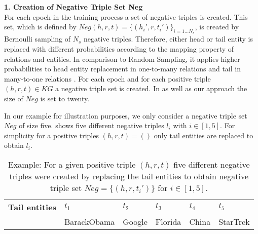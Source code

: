 \textbf{1. Creation of Negative Triple Set Neg}\\
For each epoch in the training process a set of negative triples is created.
This set, which is defined by $Neg(h,r,t)=\{(h_i',r,t_i')\}_{i=1\dots N_s}$, is created by Bernoulli sampling of $N_s$ negative triples.
Therefore, either head or tail entity is replaced with different probabilities according to the mapping property of relations and entities.
In comparison to Random Sampling, it applies higher probabilities to head entity replacement in one-to-many relations and tail in many-to-one relations \cite{qiannegative}.
For each epoch and for each positive triple $(h,r,t) \in KG$ a negative triple set is created.
In \kbgan as well as our approach the size of $Neg$ is set to twenty.

In our example for illustration purposes, we only consider a negative triple set $Neg$ of size five.
 shows five different negative triples $l_i$ with $i \in [1,5]$.
For simplicity for a positive triples $(h,r,t) = (\text{})$
only tail entities are replaced to obtain $l_i$. 
\begin{table}[h]
    \centering
    \begin{tabular}{llllll}
        \toprule
        
        \textbf{Tail entities}
        & \textbf{$t_1$} & \textbf{$t_2$} & \textbf{$t_3$} & \textbf{$t_4$} & \textbf{$t_5$} \\
         
        & BarackObama 
        & Google  
        & Florida 
        & China 
        & StarTrek\\

        \bottomrule
    \end{tabular}
    \caption{Example: For a given positive triple $(h,r,t)$ five different negative triples were created by replacing the tail entities to obtain negative triple set 
    $Neg = \{(h,r,t_i')\}$ for $i \in [1,5]$.}
\label{tab:neg_example}
\end{table}